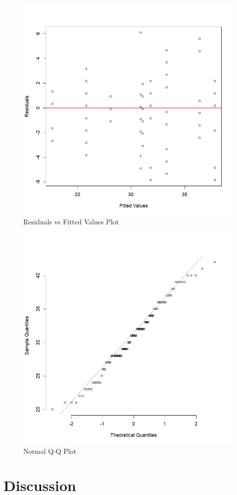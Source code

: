 \documentclass[12pt]{article}
\begin{document}
\begin{figure}[ht]
    \centering
    \includegraphics[width=0.8\linewidth]{Figures/Residual vs Fitted.png}
    \caption{Residuals vs Fitted Values Plot}
\end{figure}

\begin{figure}[ht]
    \centering
    \includegraphics[width=0.8\linewidth]{Figures/Q-Q Plot.png}
    \caption{Normal Q-Q Plot}
\end{figure}


\section{Discussion}
\end{document}
